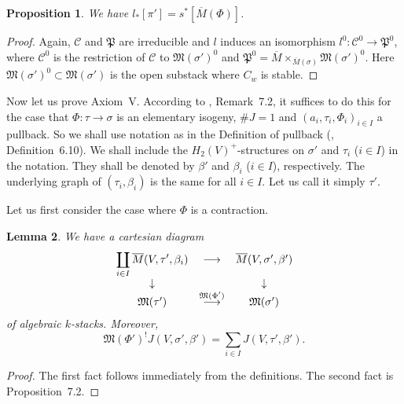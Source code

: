 \documentclass[11pt]{article}
\newcommand{\MM}{\mathfrak{M}}
\newcommand{\PP}{\mathfrak{P}}
\newcommand{\cC}{\mathcal{C}}
\newcommand{\comdia}[9]{
\begin{array}{ccc}
#1 & \stackrel{#2}{\longrightarrow} & #3 \\
\ldiag{#4} & #5 & \rdiag{#6} \\
#7 & \stackrel{#8}{\longrightarrow} & #9
\end{array}}
\newcommand{\ldiag}[1]{\makebox[0cm]{\({\scriptstyle#1}\downarrow\phantom{\scriptstyle#1}\)}}
\newcommand{\lst}{_{\ast}}
\newcommand{\ol}{\overline}
\newcommand{\rdiag}[1]{\makebox[0cm]{\(\phantom{\scriptstyle#1}\downarrow{\scriptstyle#1}\)}}
\newcommand{\upsh}{^{!}}
\newcommand{\upst}{^{\ast}}
\theoremstyle{plain}
\newtheorem{prop}{Proposition}
\newtheorem{lem}[prop]{Lemma}
\theoremstyle{remark}
\newenvironment{pf}{\begin{proof}}{\end{proof}}
\theoremstyle{plain}
\theoremstyle{definition}
\theoremstyle{remark}
\begin{document}
\begin{prop} \label{evfat}
We have \(l\lst[\pi']= s\upst [\ol{M}(\Phi)]\).
\end{prop}
\begin{pf}
Again, \(\cC\) and \(\PP\) are irreducible and \(l\) induces an isomorphism
\(l^0:\cC^0\to\PP^0\), where \(\cC^0\) is the restriction of \(\cC\) to
\(\MM(\sigma')^0\) and
\(\PP^0=\ol{M}\times_{\ol{M}(\sigma)}\MM(\sigma')^0\). Here
\(\MM(\sigma')^0\subset\MM(\sigma')\) is the open substack where \(C_w\)
is stable.
\end{pf}

Now let us prove Axiom~V.
According to \cite{BM}, Remark~7.2, it suffices to do this
for the case that \(\Phi:\tau\to \sigma\) is an elementary isogeny,
\(\#J=1\) and \((a_i,\tau_i,\Phi_i)_{i\in I}\) a pullback. So we shall use
notation as in the Definition of pullback (\cite{BM}, Definition~6.10).
We shall include the \(H_2(V)^+\)-structures on \(\sigma'\) and \(\tau_i\)
(\(i\in I\)) in the notation. They shall be denoted by \(\beta'\) and
\(\beta_i\) (\(i\in I\)), respectively.
The underlying graph of \((\tau_i,\beta_i)\) is the same for all \(i\in
I\). Let us call it simply \(\tau'\).

Let us first consider the case where \(\Phi\) is a contraction.

\begin{lem} \label{tdic}
We have a cartesian diagram
\[
\comdia{\displaystyle\coprod_{i\in I}\ol{M}(V,\tau',\beta_i)}
{}{\ol{M}(V,\sigma',\beta')} {}{}{}
{\MM(\tau')}{\MM(\Phi')}{\MM(\sigma')}
\]
of algebraic \(k\)-stacks. Moreover,
\[
\MM(\Phi')\upsh J(V,\sigma',\beta')=\sum_{i\in
I}J(V,\tau',\beta').
\]
\end{lem}
\begin{pf}
The first fact follows immediately from the definitions. The second
fact is \cite{BF} Proposition~7.2.
\end{pf}
\end{document}
